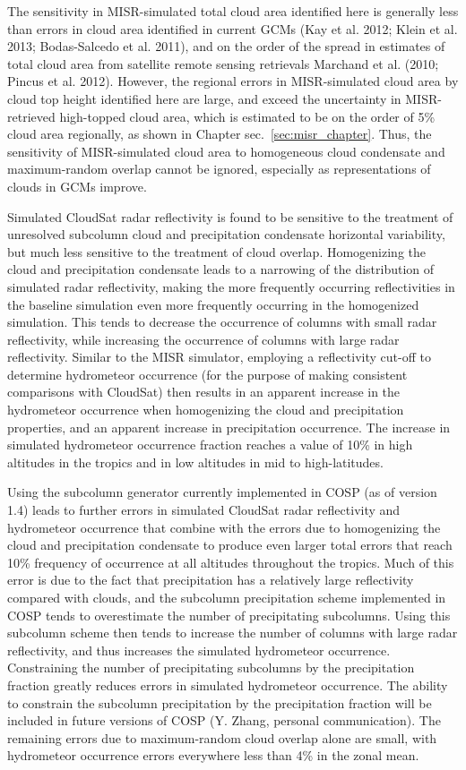 The sensitivity in MISR-simulated total cloud area identified here is
generally less than errors in cloud area identified in current GCMs (Kay
et al. 2012; Klein et al. 2013; Bodas-Salcedo et al. 2011), and on the
order of the spread in estimates of total cloud area from satellite
remote sensing retrievals Marchand et al. (2010; Pincus et al. 2012).
However, the regional errors in MISR-simulated cloud area by cloud top
height identified here are large, and exceed the uncertainty in
MISR-retrieved high-topped cloud area, which is estimated to be on the
order of 5\% cloud area regionally, as shown in Chapter
sec.~\ref{sec:misr_chapter}. Thus, the sensitivity of MISR-simulated
cloud area to homogeneous cloud condensate and maximum-random overlap
cannot be ignored, especially as representations of clouds in GCMs
improve.

Simulated CloudSat radar reflectivity is found to be sensitive to the
treatment of unresolved subcolumn cloud and precipitation condensate
horizontal variability, but much less sensitive to the treatment of
cloud overlap. Homogenizing the cloud and precipitation condensate leads
to a narrowing of the distribution of simulated radar reflectivity,
making the more frequently occurring reflectivities in the baseline
simulation even more frequently occurring in the homogenized simulation.
This tends to decrease the occurrence of columns with small radar
reflectivity, while increasing the occurrence of columns with large
radar reflectivity. Similar to the MISR simulator, employing a
reflectivity cut-off to determine hydrometeor occurrence (for the
purpose of making consistent comparisons with CloudSat) then results in
an apparent increase in the hydrometeor occurrence when homogenizing the
cloud and precipitation properties, and an apparent increase in
precipitation occurrence. The increase in simulated hydrometeor
occurrence fraction reaches a value of 10\% in high altitudes in the
tropics and in low altitudes in mid to high-latitudes.

Using the subcolumn generator currently implemented in COSP (as of
version 1.4) leads to further errors in simulated CloudSat radar
reflectivity and hydrometeor occurrence that combine with the errors due
to homogenizing the cloud and precipitation condensate to produce even
larger total errors that reach 10\% frequency of occurrence at all
altitudes throughout the tropics. Much of this error is due to the fact
that precipitation has a relatively large reflectivity compared with
clouds, and the subcolumn precipitation scheme implemented in COSP tends
to overestimate the number of precipitating subcolumns. Using this
subcolumn scheme then tends to increase the number of columns with large
radar reflectivity, and thus increases the simulated hydrometeor
occurrence. Constraining the number of precipitating subcolumns by the
precipitation fraction greatly reduces errors in simulated hydrometeor
occurrence. The ability to constrain the subcolumn precipitation by the
precipitation fraction will be included in future versions of COSP (Y.
Zhang, personal communication). The remaining errors due to
maximum-random cloud overlap alone are small, with hydrometeor
occurrence errors everywhere less than 4\% in the zonal mean.

